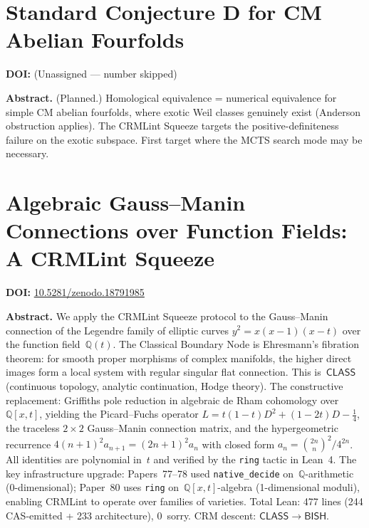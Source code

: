 \documentclass[11pt,a4paper]{article}
\begin{document}
\section{Standard Conjecture D for CM Abelian Fourfolds}
\label{sec:p79}
\textbf{DOI:} (Unassigned --- number skipped)

\bigskip
\noindent\textbf{Abstract.}
(Planned.) Homological equivalence = numerical equivalence for simple CM abelian fourfolds, where exotic Weil classes genuinely exist (Anderson obstruction applies). The CRMLint Squeeze targets the positive-definiteness failure on the exotic subspace. First target where the MCTS search mode may be necessary.

\section{Algebraic Gauss--Manin Connections over Function Fields: A CRMLint Squeeze}
\label{sec:p80}
\textbf{DOI:} \href{https://doi.org/10.5281/zenodo.18791985}{10.5281/zenodo.18791985}

\bigskip
\noindent\textbf{Abstract.}
We apply the CRMLint Squeeze protocol to the Gauss--Manin connection of the Legendre family of elliptic curves $y^2 = x(x-1)(x-t)$ over the function field~$\mathbb{Q}(t)$. The Classical Boundary Node is Ehresmann's fibration theorem: for smooth proper morphisms of complex manifolds, the higher direct images form a local system with regular singular flat connection. This is~$\mathsf{CLASS}$ (continuous topology, analytic continuation, Hodge theory). The constructive replacement: Griffiths pole reduction in algebraic de Rham cohomology over~$\mathbb{Q}[x,t]$, yielding the Picard--Fuchs operator $L = t(1-t)D^2 + (1-2t)D - \tfrac{1}{4}$, the traceless $2\times 2$ Gauss--Manin connection matrix, and the hypergeometric recurrence $4(n+1)^2 a_{n+1} = (2n+1)^2 a_n$ with closed form $a_n = \binom{2n}{n}^2 / 4^{2n}$. All identities are polynomial in~$t$ and verified by the \texttt{ring} tactic in Lean~4. The key infrastructure upgrade: Papers~77--78 used \texttt{native\_decide} on~$\mathbb{Q}$-arithmetic (0-dimensional); Paper~80 uses \texttt{ring} on~$\mathbb{Q}[x,t]$-algebra (1-dimensional moduli), enabling CRMLint to operate over families of varieties. Total Lean: 477 lines (244 CAS-emitted + 233 architecture), 0~sorry. CRM descent: $\mathsf{CLASS} \to \mathsf{BISH}$.
\end{document}

